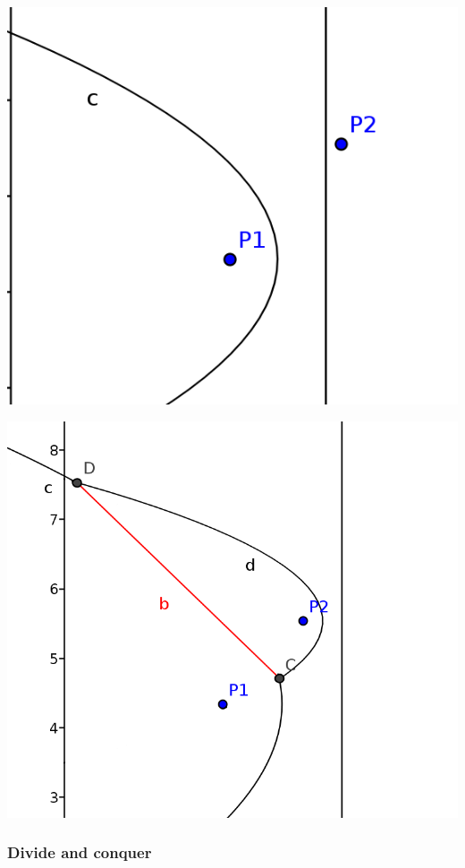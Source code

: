 \begin{minipage}[t]{0.5\textwidth}
    \includegraphics[width=\textwidth]{images/sweep_line_03.png}
\label{fig:delaunayExample018000}
\end{minipage}
\begin{minipage}[t]{0.5\textwidth}
    \includegraphics[width=\textwidth]{images/sweep_line_04.png}
\label{fig:delaunayExample018000}
\end{minipage}

\subsubsection{Divide and conquer}
\label{ssub:voronoiAlgorithmsDivAndConq}

